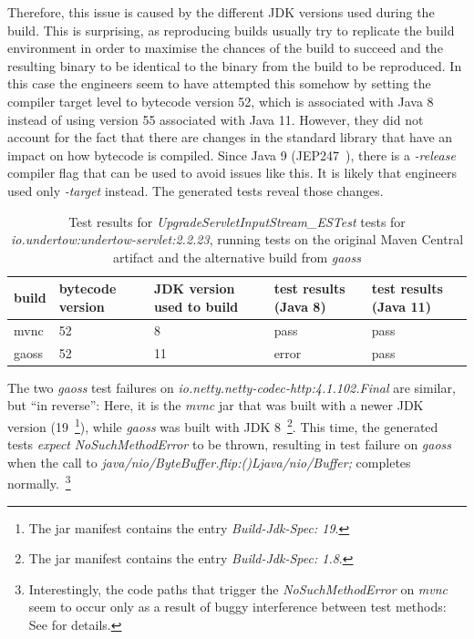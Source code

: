 \documentclass[conference]{IEEEtran}
\newcommand{\tim}[1]{\textbf{\textcolor{violet}{[ \ding{46}Tim: #1]}}}
\renewcommand{\tim}[1]{}
\begin{document}
Therefore, this issue is caused by the different JDK versions used during the build. This is surprising, as reproducing builds usually try to replicate the build environment in order to maximise the chances of the build to succeed and the resulting binary to be identical to the binary from the build to be reproduced. In this case the engineers seem to have attempted this somehow by setting the compiler target level to bytecode version 52, which is associated with Java 8~\cite[Sect. 4.1]{JVM17Spec} instead of using version 55 associated with Java 11.  However, they did not account for the fact that there are changes in the standard library that have an impact on how bytecode is compiled. Since Java 9 (JEP247~\cite{jep247}), there is a \textit{-release} compiler  flag that can be used to avoid issues like this. It is likely that engineers used only \textit{-target} instead. The generated tests reveal those changes.  

\begin{table}[h]
	\begin{tabular}{|p{1.8cm}p{0.9cm}p{1.5cm}p{1.2cm}p{1.2cm}|}
		\hline
		build         & bytecode version & JDK version used to build & test results (Java 8)                                                    & test results (Java 11) \\ \hline 
		mvnc & 52               & 8                         & pass                                                                     & pass                   \\
		gaoss         & 52               & 11                        & error & pass                  \\ \hline
	\end{tabular}
	\caption{Test results for \textit{UpgradeServletInputStream\_ESTest} tests for  \textit{io.undertow:undertow-servlet:2.2.23}, running tests on the original Maven Central artifact and the alternative build from \textit{gaoss}}
	\label{tab:nosuchmethoderror}
\end{table}

The two \textit{gaoss} test failures on \textit{io.netty.netty-codec-http:4.1.102.Final} are similar, but ``in reverse'': Here, it is the \textit{mvnc} jar that was built with a newer JDK version (19~\footnote{The jar manifest contains the entry \textit{Build-Jdk-Spec: 19}.}), while \textit{gaoss} was built with JDK 8~\footnote{The jar manifest contains the entry \textit{Build-Jdk-Spec: 1.8}.}.
This time, the generated tests \textit{expect} \textit{NoSuchMethodError} to be thrown, resulting in test failure on \textit{gaoss} when the call to \textit{java/nio/ByteBuffer.flip:()Ljava/nio/Buffer;} completes normally.~\footnote{Interestingly, the code paths that trigger the \textit{NoSuchMethodError} on \textit{mvnc} seem to occur only as a result of buggy interference between test methods: See \tim{add URL to anonymised description page, or cut} for details.}
\end{document}
